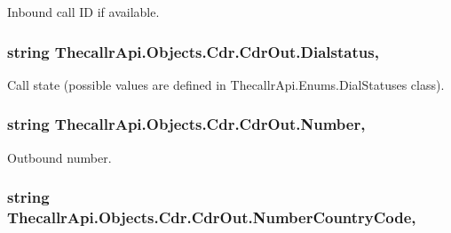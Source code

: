 Inbound call I\+D if available. 

\hypertarget{class_thecallr_api_1_1_objects_1_1_cdr_1_1_cdr_out_a3226b8ef9370dbb420fa9bd4ec2f29d2}{
\subsubsection[{Dialstatus}]{\setlength{\rightskip}{0pt plus 5cm}string Thecallr\+Api.\+Objects.\+Cdr.\+Cdr\+Out.\+Dialstatus\hspace{0.3cm}{\ttfamily [get]}, {\ttfamily [set]}}}\label{class_thecallr_api_1_1_objects_1_1_cdr_1_1_cdr_out_a3226b8ef9370dbb420fa9bd4ec2f29d2}


Call state (possible values are defined in Thecallr\+Api.\+Enums.\+Dial\+Statuses class). 

\hypertarget{class_thecallr_api_1_1_objects_1_1_cdr_1_1_cdr_out_aa53b71447be3a82fdff0e65198abbb86}{
\subsubsection[{Number}]{\setlength{\rightskip}{0pt plus 5cm}string Thecallr\+Api.\+Objects.\+Cdr.\+Cdr\+Out.\+Number\hspace{0.3cm}{\ttfamily [get]}, {\ttfamily [set]}}}\label{class_thecallr_api_1_1_objects_1_1_cdr_1_1_cdr_out_aa53b71447be3a82fdff0e65198abbb86}


Outbound number. 

\hypertarget{class_thecallr_api_1_1_objects_1_1_cdr_1_1_cdr_out_a1711e4341fa0aea1c3eedf63969f2b8f}{
\subsubsection[{Number\+Country\+Code}]{\setlength{\rightskip}{0pt plus 5cm}string Thecallr\+Api.\+Objects.\+Cdr.\+Cdr\+Out.\+Number\+Country\+Code\hspace{0.3cm}{\ttfamily [get]}, {\ttfamily [set]}}}\label{class_thecallr_api_1_1_objects_1_1_cdr_1_1_cdr_out_a1711e4341fa0aea1c3eedf63969f2b8f}


